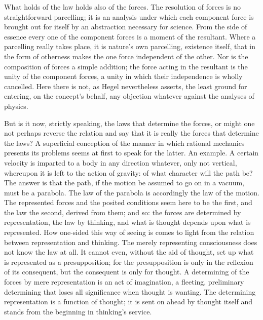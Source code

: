 \documentclass[12pt,a4paper]{book}
\begin{document}
What holds of the law holds also of the forces. The resolution of forces is no
straightforward parcelling; it is an analysis under which each component force is
brought out for itself by an abstraction necessary for science. From the side of
essence every one of the component forces is a moment of the resultant. Where a
parcelling really takes place, it is nature's own parcelling, existence itself, that
in the form of otherness makes the one force independent of the other. Nor is the
composition of forces a simple addition; the force acting in the resultant is the unity
of the component forces, a unity in which their independence is wholly cancelled. Here
there is not, as Hegel nevertheless asserts, the least ground for entering, on the
concept's behalf, any objection whatever against the analyses of physics.

But is it now, strictly speaking, the laws that determine
the forces, or might one not perhaps reverse the relation and say that it is really
the forces that determine the laws? A superficial conception of the manner in which
rational mechanics presents its problems seems at first to speak for the latter. An
example. A certain velocity is imparted to a body in any direction whatever, only not
vertical, whereupon it is left to the action of gravity: of what character will the
path be? The answer is that the path, if the motion be assumed to go on in a vacuum,
must be a parabola. The law of the parabola is accordingly the law of the motion. The
represented forces and the posited conditions seem here to be the first, and the law
the second, derived from them; and so: the forces are determined by representation,
the law by thinking, and what is thought depends upon what is represented. How
one-sided this way of seeing is comes to light from the relation between
representation and thinking. The merely representing consciousness does not know the
law at all. It cannot even, without the aid of thought, set up what is represented as
a presupposition; for the presupposition is only in the reflexion of its consequent,
but the consequent is only for thought. A determining of the forces by mere
representation is an act of imagination, a fleeting, preliminary determining that
loses all significance when thought is wanting. The determining representation is a
function of thought; it is sent on ahead by thought itself and stands from the
beginning in thinking's service.
\end{document}
